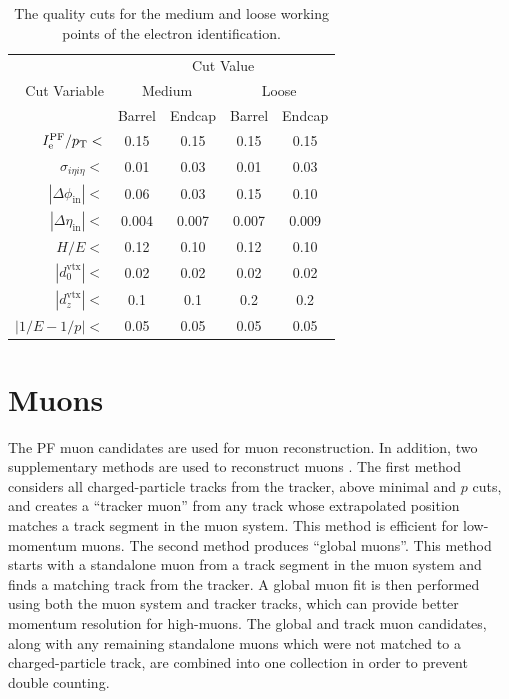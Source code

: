 \documentclass[12pt]{thesis}  %
\newcommand{\Pe}{\ensuremath{\cmsSymbolFace{e}}\xspace}
\begin{document}
\begin{table}[htb]
  \begin{center}
    \begin{tabular}{|r|c|c|c|c|}
      \hline
      \multirow{3}{*}{Cut Variable} & \multicolumn{4}{|c|}{Cut Value} \\
      \cline{2-5}
                                    & \multicolumn{2}{|c|}{Medium} & \multicolumn{2}{|c|}{Loose} \\
      \cline{2-5}
                                    & Barrel & Endcap & Barrel  & Endcap    \\
      \hline
      $I^{\text{PF}}_{\Pe}/\pt<$    & 0.15     & 0.15     & 0.15      & 0.15      \\      
      $\sigma_{i\eta i\eta}<$       & 0.01     & 0.03     & 0.01      & 0.03    \\ 
      $|\Delta\phi_{\text{in}}|<$   & 0.06     & 0.03     & 0.15      & 0.10    \\ 
      $|\Delta\eta_{\text{in}}|<$   & 0.004    & 0.007    & 0.007     & 0.009    \\ 
      $H/E<$                        & 0.12     & 0.10     & 0.12      & 0.10     \\ 
      $|d_0^{\text{vtx}}|<$         & 0.02     & 0.02     & 0.02      & 0.02     \\              
      $|d_z^{\text{vtx}}|<$         & 0.1      & 0.1      & 0.2       & 0.2      \\              
      $|1/E - 1/p|<$                & 0.05     & 0.05     & 0.05      & 0.05     \\
      \hline
    \end{tabular}
    \caption{The quality cuts for the medium and loose working points of the electron identification. }
    \label{tab:eleWP}
  \end{center}
\end{table}

\section{Muons
\label{sec:muon-reco}}

The PF muon candidates are used for muon reconstruction. In addition, two supplementary methods are used to reconstruct muons \cite{CMS-PAS-MUO-10-002}. The first method considers all charged-particle tracks from the tracker, above minimal \pt and $p$ cuts, and creates a ``tracker muon'' from any track whose extrapolated position matches a track segment in the muon system. This method is efficient for low-momentum muons. The second method produces ``global muons''. This method starts with a standalone muon from a track segment in the muon system and finds a matching track from the tracker. A global muon fit is then performed using both the muon system and tracker tracks, which can provide better momentum resolution for high-\pt muons. The global and track muon candidates, along with any remaining standalone muons which were not matched to a charged-particle track, are combined into one collection in order to prevent double counting.
\end{document}
